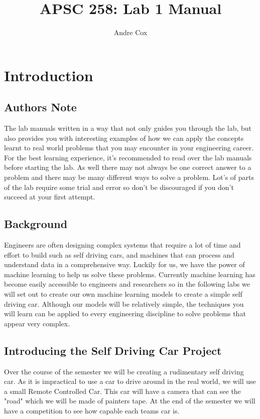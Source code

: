 \documentclass[11pt]{report}
\title{APSC 258: Lab 1 Manual}
\author{Andre Cox}
\begin{document}
    \maketitle
    \tableofcontents

    \chapter{Introduction}

    \section{Authors Note}
    The lab manuals written in a way that not only guides you through the lab, but also provides you with interesting examples of how we can apply the concepts learnt to real world problems that you may encounter in your engineering career. For the best learning experience, it's recommended to read over the lab manuals before starting the lab.
    As well there may not always be one correct answer to a problem and there may be many different ways to solve a problem. Lot's of parts of the lab require some trial and error so don't be discouraged if you don't succeed at your first attempt.


    \section{Background}
    Engineers are often designing complex systems that require a lot of time and effort to build such as self driving cars, and machines that can process and understand data in a comprehensive way.
    Luckily for us, we have the power of machine learning to help us solve these problems. Currently machine learning has become easily accessible to engineers and researchers so in the following labs we will set out to create our own machine learning models to create a simple self driving car.
    Although our models will be relatively simple, the techniques you will learn can be applied to every engineering discipline to solve problems that appear very complex.

    \section{Introducing the Self Driving Car Project}
    Over the course of the semester we will be creating a rudimentary self driving car. As it is impractical to use a car to drive around in the real world, we will use a small Remote Controlled Car. This car will have a camera that can see the "road" which we will be made of painters tape. At the end of the semester we will have a competition to see how capable each teams car is.
\end{document}
